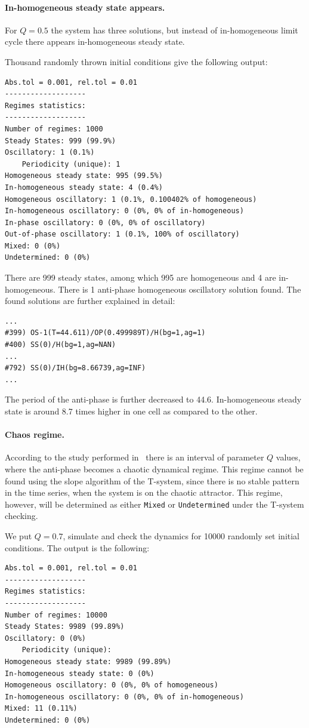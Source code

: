 \documentclass[11pt,a4paper]{article}
\begin{document}
\paragraph{In-homogeneous steady state appears.}
\label{sec:homog-steady-state-1}

For $Q=0.5$ the system has three solutions, but instead of in-homogeneous limit cycle
there appears in-homogeneous steady state.

Thousand randomly thrown initial conditions give the following output:
\begin{verbatim}
Abs.tol = 0.001, rel.tol = 0.01
-------------------
Regimes statistics:
-------------------
Number of regimes: 1000
Steady States: 999 (99.9%)
Oscillatory: 1 (0.1%)
	Periodicity (unique): 1
Homogeneous steady state: 995 (99.5%)
In-homogeneous steady state: 4 (0.4%)
Homogeneous oscillatory: 1 (0.1%, 0.100402% of homogeneous)
In-homogeneous oscillatory: 0 (0%, 0% of in-homogeneous)
In-phase oscillatory: 0 (0%, 0% of oscillatory)
Out-of-phase oscillatory: 1 (0.1%, 100% of oscillatory)
Mixed: 0 (0%)
Undetermined: 0 (0%)
\end{verbatim}

There are 999 steady states, among which 995 are homogeneous and 4 are
in-homogeneous. There is 1 anti-phase homogeneous oscillatory solution found. The
found solutions are further explained in detail:
\begin{verbatim}
...
#399) OS-1(T=44.611)/OP(0.499989T)/H(bg=1,ag=1)
#400) SS(0)/H(bg=1,ag=NAN)
...
#792) SS(0)/IH(bg=8.66739,ag=INF)
...
\end{verbatim}
The period of the anti-phase is further decreased to 44.6. In-homogeneous steady
state is around 8.7 times higher in one cell as compared to the other.

\paragraph{Chaos regime.}
\label{sec:chaos-regime}

According to the study performed in~\cite{Ullner2008} there is an interval of
parameter $Q$ values, where the anti-phase becomes a chaotic dynamical regime. This
regime cannot be found using the slope algorithm of the T-system, since there is no
stable pattern in the time series, when the system is on the chaotic attractor. This
regime, however, will be determined as either \texttt{Mixed} or \texttt{Undetermined}
under the T-system checking.

We put $Q=0.7$, simulate and check the dynamics for 10000 randomly set initial
conditions. The output is the following:
\begin{verbatim}
Abs.tol = 0.001, rel.tol = 0.01
-------------------
Regimes statistics:
-------------------
Number of regimes: 10000
Steady States: 9989 (99.89%)
Oscillatory: 0 (0%)
	Periodicity (unique):
Homogeneous steady state: 9989 (99.89%)
In-homogeneous steady state: 0 (0%)
Homogeneous oscillatory: 0 (0%, 0% of homogeneous)
In-homogeneous oscillatory: 0 (0%, 0% of in-homogeneous)
Mixed: 11 (0.11%)
Undetermined: 0 (0%)
\end{verbatim}
\end{document}
